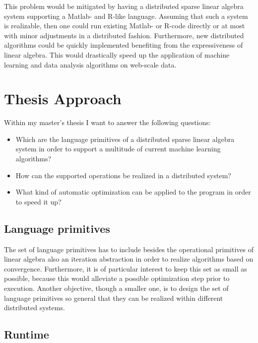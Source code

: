 \documentclass{dima}
\begin{document}
 This problem would be mitigated by having a distributed sparse linear algebra system supporting a Matlab- and R-like language.
 Assuming that such a system is realizable, then one could run existing Matlab- or R-code directly or at most with minor adjustments in a distributed fashion.
 Furthermore, new distributed algorithms could be quickly implemented benefiting from the expressiveness of linear algebra.
 This would drastically speed up the application of machine learning and data analysis algorithms on web-scale data.


\section{Thesis Approach}

Within my master's thesis I want to answer the following questions:
\begin{itemize}
	\item Which are the language primitives of a distributed sparse linear algebra system in order to support a multitude of current machine learning algorithms?
	\item How can the supported operations be realized in a distributed system?
	\item What kind of automatic optimization can be applied to the program in order to speed it up?
\end{itemize}

\subsection{Language primitives}

The set of language primitives has to include besides the operational primitives of linear algebra also an iteration abstraction in order to realize algorithms based on convergence.
Furthermore, it is of particular interest to keep this set as small as possible, because this would alleviate a possible optimization step prior to execution.
Another objective, though a smaller one, is to design the set of language primitives so general that they can be realized within different distributed systems.

\subsection{Runtime}
\end{document}
